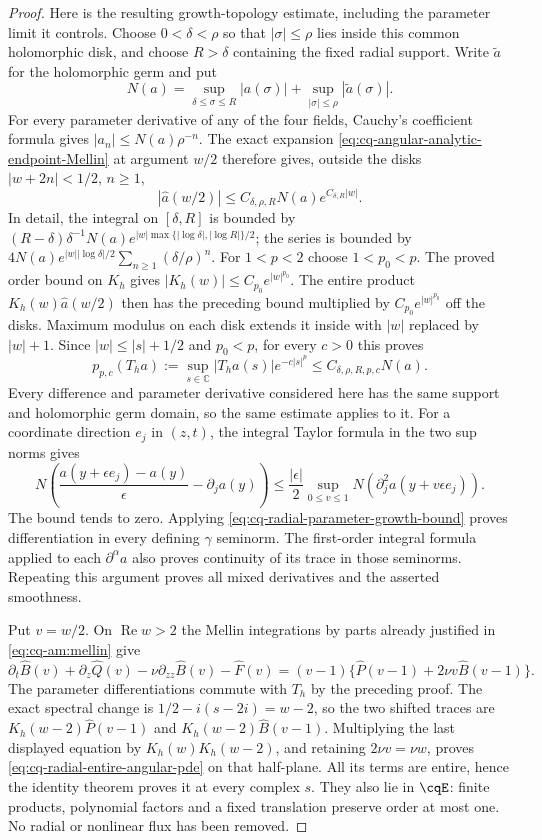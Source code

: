 \begin{proof}
Here is the resulting growth-topology estimate, including the
parameter limit it controls. Choose $0<\delta<\rho$ so that
$|\sigma|\leq\rho$ lies inside this common holomorphic disk,
and choose $R>\delta$ containing the fixed radial support. Write
$\widetilde a$ for the holomorphic germ and put
\[
 N(a)=\sup_{\delta\leq\sigma\leq R}|a(\sigma)|
             +\sup_{|\sigma|\leq\rho}|\widetilde a(\sigma)|.
\]
For every parameter derivative of any of the four fields, Cauchy's
coefficient formula gives $|a_n|\leq N(a)\rho^{-n}$.
The exact expansion \eqref{eq:cq-angular-analytic-endpoint-Mellin}
at argument $w/2$ therefore gives, outside the disks
$|w+2n|<1/2$, $n\geq1$,
\[
 |\widehat a(w/2)|\leq C_{\delta,\rho,R}N(a)e^{C_{\delta,R}|w|}.
\]
In detail, the integral on $[\delta,R]$ is bounded by
$(R-\delta)\delta^{-1}N(a)
 e^{|w|\max\{|\log\delta|,|\log R|\}/2}$; the series is
bounded by
$4N(a)e^{|w||\log\delta|/2}
 \sum_{n\geq1}(\delta/\rho)^n$.
For $1<p<2$ choose $1<p_0<p$. The proved order bound on $K_h$
gives $|K_h(w)|\leq C_{p_0} e^{|w|^{p_0}}$. The entire product
$K_h(w)\widehat a(w/2)$ then has the preceding bound multiplied
by $C_{p_0} e^{|w|^{p_0}}$ off the disks. Maximum modulus on each disk
extends it inside with $|w|$ replaced by $|w|+1$.
Since $|w|\leq|s|+1/2$ and $p_0<p$, for every $c>0$ this proves
\begin{equation}
 p_{p,c}(T_ha):=\sup_{s\in\mathbb C}
         |T_ha(s)|e^{-c|s|^p}
       \leq C_{\delta,\rho,R,p,c}N(a).
\label{eq:cq-radial-parameter-growth-bound}
\end{equation}
Every difference and parameter derivative considered here has
the same support and holomorphic germ domain, so the same estimate
applies to it. For a coordinate direction $e_j$ in $(z,t)$,
the integral Taylor formula in the two sup norms gives
\[
 N\!\left(\frac{a(y+\epsilon e_j)-a(y)}{\epsilon}
                        -\partial_j a(y)\right)
 \leq\frac{|\epsilon|}{2}
       \sup_{0\leq v\leq1}N(\partial_j^2a(y+v\epsilon e_j)).
\]
The bound tends to zero. Applying
\eqref{eq:cq-radial-parameter-growth-bound} proves differentiation
in every defining $\gamma$ seminorm. The first-order integral
formula applied to each $\partial^\alpha a$ also proves continuity
of its trace in those seminorms. Repeating this argument proves
all mixed derivatives and the asserted smoothness.

Put $v=w/2$. On $\operatorname{Re}w>2$ the Mellin integrations
by parts already justified in \eqref{eq:cq-am:mellin} give
\[
 \partial_t\widehat B(v)+\partial_z\widehat Q(v)
       -\nu\partial_{zz}\widehat B(v)-\widehat F(v)
  =(v-1)\{\widehat P(v-1)+2\nu v\widehat B(v-1)\}.
\]
The parameter differentiations commute with $T_h$ by the preceding
proof. The exact spectral change is
$1/2-i(s-2i)=w-2$, so the two shifted traces are
$K_h(w-2)\widehat P(v-1)$ and
$K_h(w-2)\widehat B(v-1)$. Multiplying the last displayed
equation by $K_h(w)K_h(w-2)$, and retaining $2\nu v=\nu w$,
proves \eqref{eq:cq-radial-entire-angular-pde} on that half-plane.
All its terms are entire, hence the identity theorem proves it
at every complex $s$. They also lie in $\cqE$: finite products,
polynomial factors and a fixed translation preserve order at
most one. No radial or nonlinear flux has been removed.


\end{proof}
